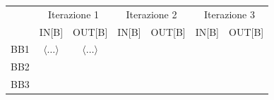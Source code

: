 \documentclass[10pt,a4paper]{article}
\begin{document}
\begin{table}[h!]
\centering
\renewcommand{\arraystretch}{1.5}
\begin{tabular}{|c|c|c|c|c|c|c|}
\hline
\rowcolor{blue!30}
 & \multicolumn{2}{c|}{Iterazione 1} & \multicolumn{2}{c|}{Iterazione 2} & \multicolumn{2}{c|}{Iterazione 3} \\
\rowcolor{blue!30}
 & IN[B] & OUT[B] & IN[B] & OUT[B] & IN[B] & OUT[B] \\
\hline
BB1 & $\langle \ldots \rangle$ & $\langle \ldots \rangle$ & & & & \\
\hline
BB2 & & & & & & \\
\hline
BB3 & & & & & & \\
\hline
\end{tabular}
\end{table}
\end{document}
